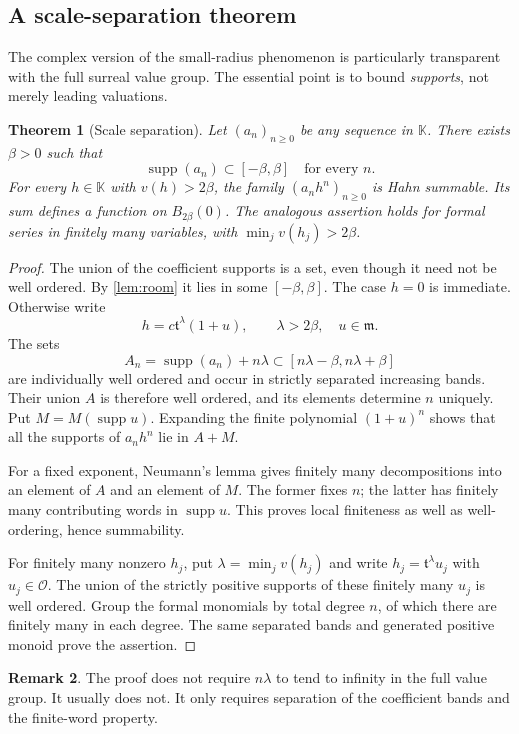 \documentclass[11pt,a4paper]{article}
\numberwithin{equation}{section}
\newtheorem{theorem}{Theorem}[section]
\theoremstyle{definition}
\newtheorem{remark}[theorem]{Remark}
\newcommand{\K}{\mathbb K}
\newcommand{\tmon}{\mathfrak t}
\newcommand{\OO}{\mathcal O}
\newcommand{\mm}{\mathfrak m}
\newcommand{\supp}{\operatorname{supp}}
\begin{document}
\subsection{A scale-separation theorem}

The complex version of the small-radius phenomenon is particularly transparent
with the full surreal value group. The essential point is to bound
\emph{supports}, not merely leading valuations.

\begin{theorem}[Scale separation]\label{thm:scale}
Let $(a_n)_{n\geq0}$ be any sequence in $\K$. There exists $\beta>0$ such that
\[
 \supp(a_n)\subset[-\beta,\beta]\quad\text{for every }n.
\]
For every $h\in\K$ with $v(h)>2\beta$, the family $(a_nh^n)_{n\geq0}$ is
Hahn summable. Its sum defines a function on $B_{2\beta}(0)$.
The analogous assertion holds for formal series in finitely many variables,
with $\min_jv(h_j)>2\beta$.
\end{theorem}
\begin{proof}
The union of the coefficient supports is a set, even though it need not be
well ordered. By \cref{lem:room} it lies in some $[-\beta,\beta]$.
The case $h=0$ is immediate. Otherwise write
\[
 h=c\tmon^\lambda(1+u),\qquad\lambda>2\beta,\quad u\in\mm.
\]
The sets
\[
 A_n=\supp(a_n)+n\lambda\subset[n\lambda-\beta,n\lambda+\beta]
\]
are individually well ordered and occur in strictly separated increasing
bands. Their union $A$ is therefore well ordered, and its elements determine
$n$ uniquely. Put $M=M(\supp u)$. Expanding the finite polynomial $(1+u)^n$
shows that all the supports of $a_nh^n$ lie in $A+M$.

For a fixed exponent, Neumann's lemma gives finitely many decompositions into
an element of $A$ and an element of $M$. The former fixes $n$; the latter has
finitely many contributing words in $\supp u$. This proves local finiteness
as well as well-ordering, hence summability.

For finitely many nonzero $h_j$, put $\lambda=\min_jv(h_j)$ and write
$h_j=\tmon^\lambda u_j$ with $u_j\in\OO$. The union of the strictly positive
supports of these finitely many $u_j$ is well ordered. Group the formal
monomials by total degree $n$, of which there are finitely many in each degree.
The same separated bands and generated positive monoid prove the assertion.
\end{proof}

\begin{remark}
The proof does not require $n\lambda$ to tend to infinity in the full value
group. It usually does not. It only requires separation of the coefficient
bands and the finite-word property.
\end{remark}
\end{document}
